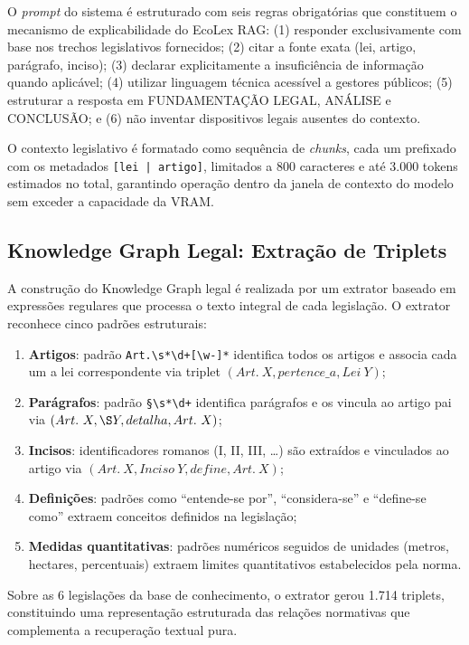 \documentclass[12pt]{article}
\begin{document}
O \textit{prompt} do sistema é estruturado com seis regras obrigatórias que constituem o mecanismo de explicabilidade do EcoLex RAG: (1) responder exclusivamente com base nos trechos legislativos fornecidos; (2) citar a fonte exata (lei, artigo, parágrafo, inciso); (3) declarar explicitamente a insuficiência de informação quando aplicável; (4) utilizar linguagem técnica acessível a gestores públicos; (5) estruturar a resposta em FUNDAMENTAÇÃO LEGAL, ANÁLISE e CONCLUSÃO; e (6) não inventar dispositivos legais ausentes do contexto.

O contexto legislativo é formatado como sequência de \textit{chunks}, cada um prefixado com os metadados \texttt{[lei | artigo]}, limitados a 800 caracteres e até 3.000 tokens estimados no total, garantindo operação dentro da janela de contexto do modelo sem exceder a capacidade da VRAM.

\subsection{Knowledge Graph Legal: Extração de Triplets}

A construção do Knowledge Graph legal é realizada por um extrator baseado em expressões regulares que processa o texto integral de cada legislação. O extrator reconhece cinco padrões estruturais:

\begin{enumerate}
\item \textbf{Artigos}: padrão \texttt{Art.\textbackslash s*\textbackslash d+[\textbackslash w-]*} identifica todos os artigos e associa cada um a lei correspondente via triplet $(Art.\ X, pertence\_a, Lei\ Y)$;
\item \textbf{Parágrafos}: padrão \texttt{\S\textbackslash s*\textbackslash d+} identifica parágrafos e os vincula ao artigo pai via $(Art.\ X, \S Y, detalha, Art.\ X)$;
\item \textbf{Incisos}: identificadores romanos (I, II, III, \ldots) são extraídos e vinculados ao artigo via $(Art.\ X, Inciso\ Y, define, Art.\ X)$;
\item \textbf{Definições}: padrões como ``entende-se por'', ``considera-se'' e ``define-se como'' extraem conceitos definidos na legislação;
\item \textbf{Medidas quantitativas}: padrões numéricos seguidos de unidades (metros, hectares, percentuais) extraem limites quantitativos estabelecidos pela norma.
\end{enumerate}

Sobre as 6 legislações da base de conhecimento, o extrator gerou 1.714 triplets, constituindo uma representação estruturada das relações normativas que complementa a recuperação textual pura.
\end{document}
